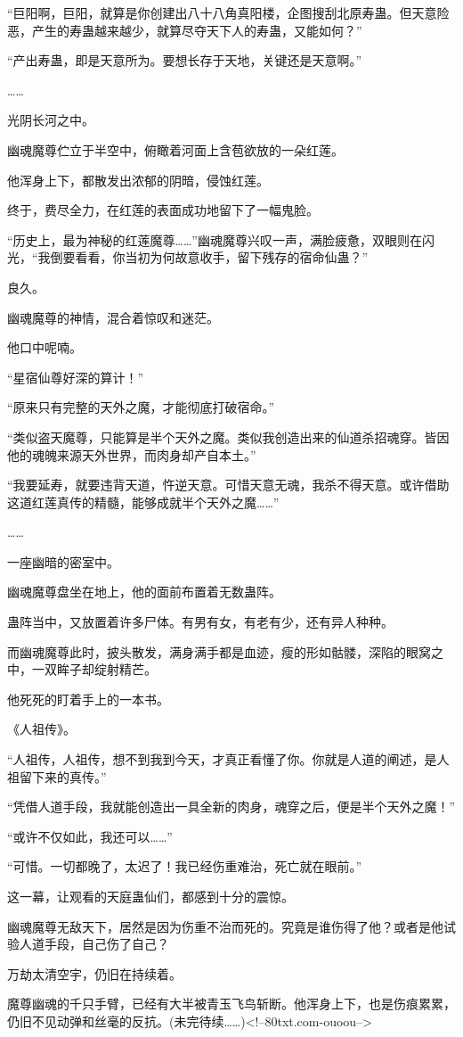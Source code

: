 \begin{this_body}
“巨阳啊，巨阳，就算是你创建出八十八角真阳楼，企图搜刮北原寿蛊。但天意险恶，产生的寿蛊越来越少，就算尽夺天下人的寿蛊，又能如何？”

“产出寿蛊，即是天意所为。要想长存于天地，关键还是天意啊。”

……

光阴长河之中。

幽魂魔尊伫立于半空中，俯瞰着河面上含苞欲放的一朵红莲。

他浑身上下，都散发出浓郁的阴暗，侵蚀红莲。

终于，费尽全力，在红莲的表面成功地留下了一幅鬼脸。

“历史上，最为神秘的红莲魔尊……”幽魂魔尊兴叹一声，满脸疲惫，双眼则在闪光，“我倒要看看，你当初为何故意收手，留下残存的宿命仙蛊？”

良久。

幽魂魔尊的神情，混合着惊叹和迷茫。

他口中呢喃。

“星宿仙尊好深的算计！”

“原来只有完整的天外之魔，才能彻底打破宿命。”

“类似盗天魔尊，只能算是半个天外之魔。类似我创造出来的仙道杀招魂穿。皆因他的魂魄来源天外世界，而肉身却产自本土。”

“我要延寿，就要违背天道，忤逆天意。可惜天意无魂，我杀不得天意。或许借助这道红莲真传的精髓，能够成就半个天外之魔……”

……

一座幽暗的密室中。

幽魂魔尊盘坐在地上，他的面前布置着无数蛊阵。

蛊阵当中，又放置着许多尸体。有男有女，有老有少，还有异人种种。

而幽魂魔尊此时，披头散发，满身满手都是血迹，瘦的形如骷髅，深陷的眼窝之中，一双眸子却绽射精芒。

他死死的盯着手上的一本书。

《人祖传》。

“人祖传，人祖传，想不到我到今天，才真正看懂了你。你就是人道的阐述，是人祖留下来的真传。”

“凭借人道手段，我就能创造出一具全新的肉身，魂穿之后，便是半个天外之魔！”

“或许不仅如此，我还可以……”

“可惜。一切都晚了，太迟了！我已经伤重难治，死亡就在眼前。”

这一幕，让观看的天庭蛊仙们，都感到十分的震惊。

幽魂魔尊无敌天下，居然是因为伤重不治而死的。究竟是谁伤得了他？或者是他试验人道手段，自己伤了自己？

万劫太清空宇，仍旧在持续着。

魔尊幽魂的千只手臂，已经有大半被青玉飞鸟斩断。他浑身上下，也是伤痕累累，仍旧不见动弹和丝毫的反抗。(未完待续……)<!--80txt.com-ouoou-->

\end{this_body}

